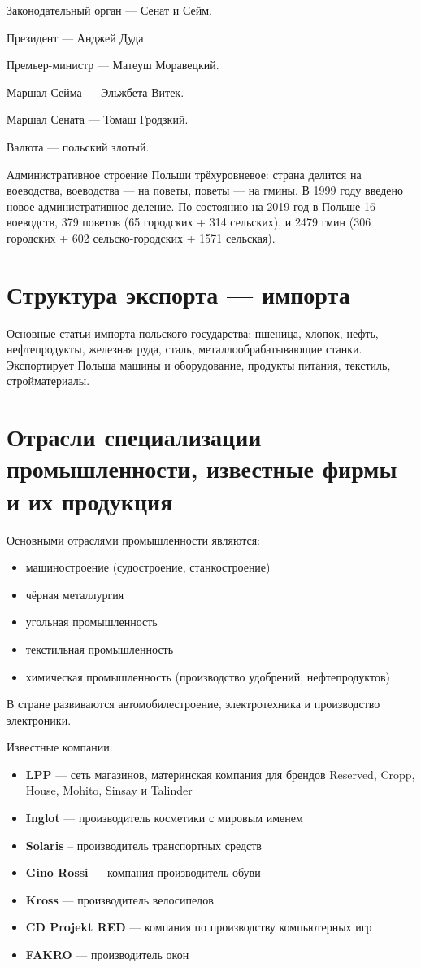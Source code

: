 \documentclass[12pt]{article}
\begin{document}
Законодательный орган --- Сенат и Сейм.

Президент --- Анджей Дуда.

Премьер-министр --- Матеуш Моравецкий.

Маршал Сейма --- Эльжбета Витек.

Маршал Сената --- Томаш Гродзкий.

Валюта --- польский злотый.

Административное строение Польши трёхуровневое: страна делится на воеводства, воеводства — на поветы, поветы — на гмины.
В 1999 году введено новое административное деление. По состоянию на 2019 год в Польше 16 воеводств, 379 поветов (65 городских + 314 сельских), и 2479 гмин (306 городских + 602 сельско-городских + 1571 сельская).

\section{Структура экспорта --- импорта}
Основные статьи импорта польского государства: пшеница, хлопок, нефть, нефтепродукты, железная руда, сталь, металлообрабатывающие станки.
Экспортирует Польша машины и оборудование, продукты питания, текстиль, стройматериалы.

\section{Отрасли специализации промышленности, известные фирмы и их продукция}
Основными отраслями промышленности являются:
\begin{itemize}
    \item машиностроение (судостроение, станкостроение)
    \item чёрная металлургия
    \item угольная промышленность
    \item текстильная промышленность
    \item химическая промышленность (производство удобрений, нефтепродуктов)
\end{itemize}

В стране развиваются автомобилестроение, электротехника и производство электроники.

Известные компании:
\begin{itemize}
    \item \textbf{LPP} --- сеть магазинов, материнская компания для брендов Reserved, Cropp, House, Mohito, Sinsay и Talinder
    \item \textbf{Inglot} --- производитель косметики с мировым именем
    \item \textbf{Solaris} -- производитель транспортных средств
    \item \textbf{Gino Rossi} --- компания-производитель обуви
    \item \textbf{Kross} --- производитель велосипедов
    \item \textbf{CD Projekt RED} --- компания по производству компьютерных игр
    \item \textbf{FAKRO} --- производитель окон
\end{itemize}
\end{document}
